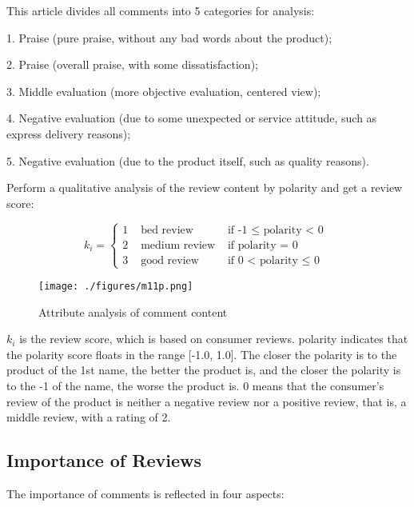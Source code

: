 \documentclass{mcmthesis}
\begin{document}
This article divides all comments into 5 categories for analysis:

1. Praise (pure praise, without any bad words about the product);

2. Praise (overall praise, with some dissatisfaction);

3. Middle evaluation (more objective evaluation, centered view);

4. Negative evaluation (due to some unexpected or service attitude, such as express delivery reasons);

5. Negative evaluation (due to the product itself, such as quality reasons).

Perform a qualitative analysis of the review content by polarity and get a review score:

\begin{equation}\label{m1gs1}
k_i=\left\{\begin{array}{lll}
1 & \text { bed review } & \text {if -1 $\leq$ polarity < 0 }\\
2 & \text { medium review } & \text {if polarity = 0 }\\
3 & \text { good review } & \text {if 0 < polarity $\leq$ 0 }
\end{array}\right.
\end{equation}

\begin{figure}[!htbp]
\centering
\texttt{[image: ./figures/m11p.png]}
\caption{Attribute analysis of comment content} \label{m11p}
\end{figure}

$k_i$ is the review score, which is based on consumer reviews. polarity indicates that the polarity score floats in the range [-1.0, 1.0]. The closer the polarity is to the product of the 1st name, the better the product is, and the closer the polarity is to the -1 of the name, the worse the product is. 0 means that the consumer's review of the product is neither a negative review nor a positive review, that is, a middle review, with a rating of 2.

\subsection{Importance of Reviews}

The importance of comments is reflected in four aspects:
\end{document}
